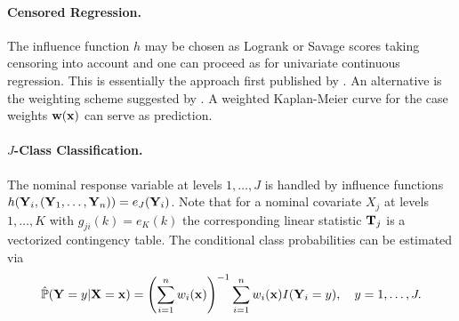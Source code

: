 \documentclass[letter]{article}
\begin{document}
\paragraph{Censored Regression.}
The influence function $h$ may be chosen as 
Logrank or Savage scores taking censoring into
account and one can proceed as for univariate continuous regression. This is
essentially the approach first published by \cite{regression:1988}. 
An alternative is the weighting scheme suggested by
\cite{MolinaroDudiotvdLaan2003}. A weighted Kaplan-Meier curve for the case
weights $\mathbf{w}(\mathbf{x})$ can serve as prediction. 

\paragraph{$J$-Class Classification.}
The nominal response variable at levels $1, \dots, J$ 
is handled by influence
functions $h(\mathbf{Y}_i, (\mathbf{Y}_1, \dots, \mathbf{Y}_n)) = e_J(\mathbf{Y}_i)$. Note that for a
nominal covariate $X_j$ at levels $1, \dots, K$ with  
$g_{ji}(k) = e_K(k)$ the
corresponding linear statistic $\mathbf{T}_j$ is a vectorized contingency table.
The conditional class probabilities can be estimated via 
\begin{eqnarray*}
\hat{\mathbb{P}}(\mathbf{Y} = y | \mathbf{X} = \mathbf{x}) = \left(\sum_{i=1}^n w_i(\mathbf{x})\right)^{-1}
\sum_{i=1}^n
w_i(\mathbf{x}) I(\mathbf{Y}_i = y), \quad y = 1, \dots, J.
\end{eqnarray*}
\end{document}
